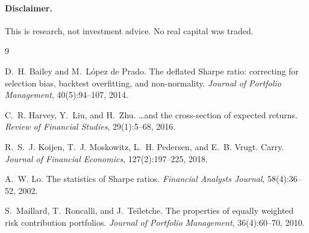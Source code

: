 \documentclass[11pt,a4paper]{article}
\begin{document}
\paragraph{Disclaimer.} This is research, not investment advice. No real capital was
traded.

\begin{thebibliography}{9}
\setlength{\itemsep}{2pt}\small

D.~H. Bailey and M.~L\'opez de Prado.
\newblock The deflated Sharpe ratio: correcting for selection bias, backtest
  overfitting, and non-normality.
\newblock \emph{Journal of Portfolio Management}, 40(5):94--107, 2014.

C.~R. Harvey, Y.~Liu, and H.~Zhu.
\newblock \ldots and the cross-section of expected returns.
\newblock \emph{Review of Financial Studies}, 29(1):5--68, 2016.

R.~S.~J. Koijen, T.~J. Moskowitz, L.~H. Pedersen, and E.~B. Vrugt.
\newblock Carry.
\newblock \emph{Journal of Financial Economics}, 127(2):197--225, 2018.

A.~W. Lo.
\newblock The statistics of Sharpe ratios.
\newblock \emph{Financial Analysts Journal}, 58(4):36--52, 2002.

S.~Maillard, T.~Roncalli, and J.~Te\"iletche.
\newblock The properties of equally weighted risk contribution portfolios.
\newblock \emph{Journal of Portfolio Management}, 36(4):60--70, 2010.

\end{thebibliography}
\end{document}
